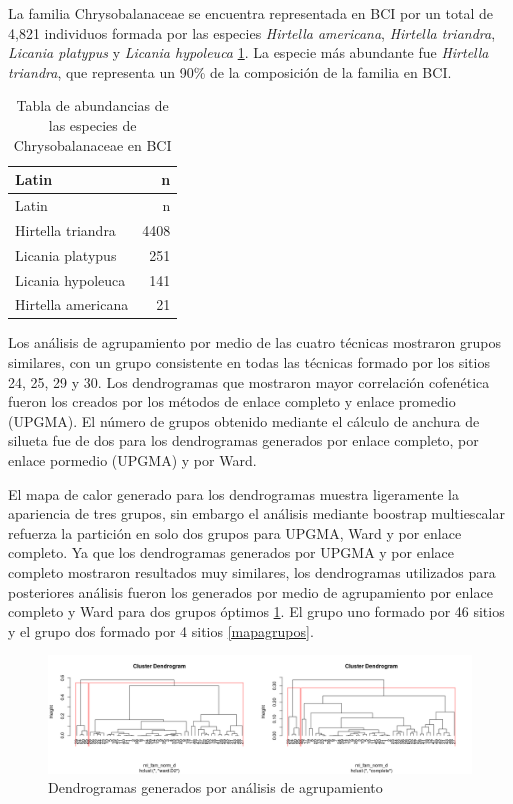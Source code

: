 \documentclass[11pt,]{article}
\begin{document}
La familia Chrysobalanaceae se encuentra representada en BCI por un
total de 4,821 individuos formada por las especies \emph{Hirtella
americana}, \emph{Hirtella triandra}, \emph{Licania platypus} y
\emph{Licania hypoleuca} \ref{tab:abun_sp}. La especie más abundante fue
\emph{Hirtella triandra}, que representa un 90\% de la composición de la
familia en BCI.

\begin{longtable}[]{@{}lr@{}}
\caption{\label{tab:abun_sp}Tabla de abundancias de las especies de
Chrysobalanaceae en BCI}\tabularnewline
\toprule
Latin & n\tabularnewline
\midrule
\endfirsthead
\toprule
Latin & n\tabularnewline
\midrule
\endhead
Hirtella triandra & 4408\tabularnewline
Licania platypus & 251\tabularnewline
Licania hypoleuca & 141\tabularnewline
Hirtella americana & 21\tabularnewline
\bottomrule
\end{longtable}

Los análisis de agrupamiento por medio de las cuatro técnicas mostraron
grupos similares, con un grupo consistente en todas las técnicas formado
por los sitios 24, 25, 29 y 30. Los dendrogramas que mostraron mayor
correlación cofenética fueron los creados por los métodos de enlace
completo y enlace promedio (UPGMA). El número de grupos obtenido
mediante el cálculo de anchura de silueta fue de dos para los
dendrogramas generados por enlace completo, por enlace pormedio (UPGMA)
y por Ward.

El mapa de calor generado para los dendrogramas muestra ligeramente la
apariencia de tres grupos, sin embargo el análisis mediante boostrap
multiescalar refuerza la partición en solo dos grupos para UPGMA, Ward y
por enlace completo. Ya que los dendrogramas generados por UPGMA y por
enlace completo mostraron resultados muy similares, los dendrogramas
utilizados para posteriores análisis fueron los generados por medio de
agrupamiento por enlace completo y Ward para dos grupos óptimos
\ref{clusters}. El grupo uno formado por 46 sitios y el grupo dos
formado por 4 sitios \ref{mapagrupos}.

\begin{figure}
\centering
\includegraphics[width=1.00000\textwidth]{Clusters.png}
\caption{Dendrogramas generados por análisis de
agrupamiento\label{clusters}}
\end{figure}
\end{document}

